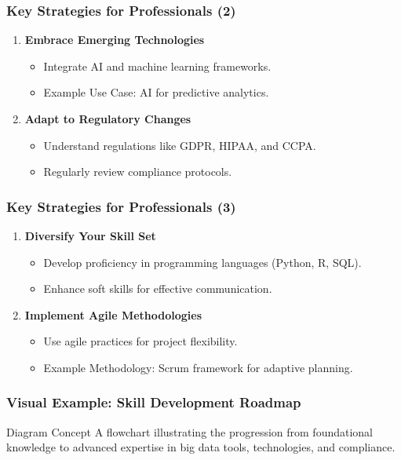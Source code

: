 \documentclass[aspectratio=169]{beamer}
\begin{document}
\begin{frame}[fragile]
    \frametitle{Key Strategies for Professionals (2)}
    \begin{enumerate}[resume]
        \item \textbf{Embrace Emerging Technologies}
        \begin{itemize}
            \item Integrate AI and machine learning frameworks.
            \item Example Use Case: AI for predictive analytics.
        \end{itemize}

        \item \textbf{Adapt to Regulatory Changes}
        \begin{itemize}
            \item Understand regulations like GDPR, HIPAA, and CCPA.
            \item Regularly review compliance protocols.
        \end{itemize}
    \end{enumerate}
\end{frame}

\begin{frame}[fragile]
    \frametitle{Key Strategies for Professionals (3)}
    \begin{enumerate}[resume]
        \item \textbf{Diversify Your Skill Set}
        \begin{itemize}
            \item Develop proficiency in programming languages (Python, R, SQL).
            \item Enhance soft skills for effective communication.
        \end{itemize}

        \item \textbf{Implement Agile Methodologies}
        \begin{itemize}
            \item Use agile practices for project flexibility.
            \item Example Methodology: Scrum framework for adaptive planning.
        \end{itemize}
    \end{enumerate}
\end{frame}

\begin{frame}[fragile]
    \frametitle{Visual Example: Skill Development Roadmap}
    \begin{block}{Diagram Concept}
        A flowchart illustrating the progression from foundational knowledge to advanced expertise in big data tools, technologies, and compliance.
    \end{block}
\end{frame}
\end{document}
